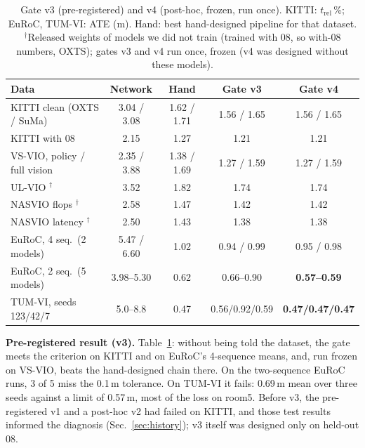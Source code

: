\documentclass[letterpaper,journal]{IEEEtran}
\begin{document}
\begin{table}[t]
\caption{Gate v3 (pre-registered) and v4 (post-hoc, frozen, run once). KITTI: $t_\mathrm{rel}$\,\%; EuRoC, TUM-VI: ATE (m). Hand: best hand-designed pipeline for that dataset. $^\dagger$Released weights of models we did not train (trained with 08, so with-08 numbers, OXTS); gates v3 and v4 run once, frozen (v4 was designed without these models).}
\label{tab:gate}
\centering\small
\setlength{\tabcolsep}{8pt}
\begin{tabular}{@{}lcccc@{}}
\toprule
Data & Network & Hand & Gate v3 & Gate v4 \\
\midrule
KITTI clean (OXTS / SuMa) & 3.04 / 3.08 & 1.62 / 1.71 & 1.56 / 1.65 & 1.56 / 1.65 \\
KITTI with 08 & 2.15 & 1.27 & 1.21 & 1.21 \\
VS-VIO, policy / full vision & 2.35 / 3.88 & 1.38 / 1.69 & 1.27 / 1.59 & 1.27 / 1.59 \\
UL-VIO \cite{Park2024ULVIO}$^\dagger$ & 3.52 & 1.82 & 1.74 & 1.74 \\
NASVIO flops \cite{Chen2023NASVIO}$^\dagger$ & 2.58 & 1.47 & 1.42 & 1.42 \\
NASVIO latency \cite{Chen2023NASVIO}$^\dagger$ & 2.50 & 1.43 & 1.38 & 1.38 \\
EuRoC, 4 seq.\ (2 models) & 5.47 / 6.60 & 1.02 & 0.94 / 0.99 & 0.95 / 0.98 \\
EuRoC, 2 seq.\ (5 models) & 3.98--5.30 & 0.62 & 0.66--0.90 & \textbf{0.57--0.59} \\
TUM-VI, seeds 123/42/7 & 5.0--8.8 & 0.47 & 0.56/0.92/0.59 & \textbf{0.47/0.47/0.47} \\
\bottomrule
\end{tabular}
\end{table}

\textbf{Pre-registered result (v3).} Table~\ref{tab:gate}: without being told the dataset, the gate meets the criterion on KITTI and on EuRoC's 4-sequence means, and, run frozen on VS-VIO, beats the hand-designed chain there. On the two-sequence EuRoC runs, 3 of 5 miss the 0.1\,m tolerance. On TUM-VI it fails: 0.69\,m mean over three seeds against a limit of 0.57\,m, most of the loss on room5. Before v3, the pre-registered v1 and a post-hoc v2 had failed on KITTI, and those test results informed the diagnosis (Sec.~\ref{sec:history}); v3 itself was designed only on held-out 08.
\end{document}
